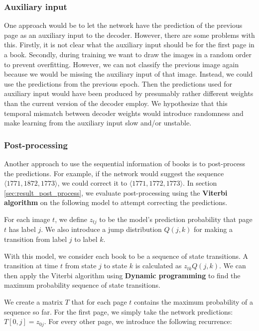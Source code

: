 \subsubsection{Auxiliary input}

One approach would be to let the network have the prediction of the previous page as an auxiliary input to the decoder. However, there are some problems with this. Firstly, it is not clear what the auxiliary input should be for the first page in a book. Secondly, during training we want to draw the images in a random order to prevent overfitting. However, we can not classify the previous image again because we would be missing the auxiliary input of that image. Instead, we could use the predictions from the previous epoch. Then the predictions used for auxiliary input would have been produced by presumably rather different weights than the current version of the decoder employ. We hypothesize that this temporal mismatch between decoder weights would introduce randomness and make learning from the auxiliary input slow and/or unstable.

\subsubsection{Post-processing}

Another approach to use the sequential information of books is to post-process the predictions. For example, if the network would suggest the sequence $\langle 1771, 1872, 1773 \rangle$, we could correct it to $\langle 1771, 1772, 1773 \rangle$.
In section \ref{sec:result_post_process}, we evaluate post-processing using the \textbf{Viterbi algorithm} on the following model
to attempt correcting the predictions.

For each image $t$, we define $z_{tj}$ to be the model's prediction probability that page $t$ has label $j$. We also introduce a jump distribution $Q(j, k)$ for making a transition from label $j$ to label $k$.

With this model, we consider each book to be a sequence of state transitions. A transition at time $t$ from state $j$ to state $k$ is calculated as $z_{tk} Q(j, k)$. We can then apply the Viterbi algorithm using \textbf{Dynamic programming} to find the maximum probability sequence of state transitions.

We create a matrix $T$ that for each page $t$ contains the maximum probability of a sequence so far. For the first page, we simply take the network predictions: $T[0,j] = z_{0j}$. For every other page, we introduce the following recurrence:

